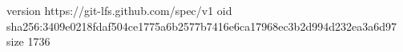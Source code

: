 version https://git-lfs.github.com/spec/v1
oid sha256:3409e0218fdaf504ce1775a6b2577b7416e6ca17968ec3b2d994d232ea3a6d97
size 1736
